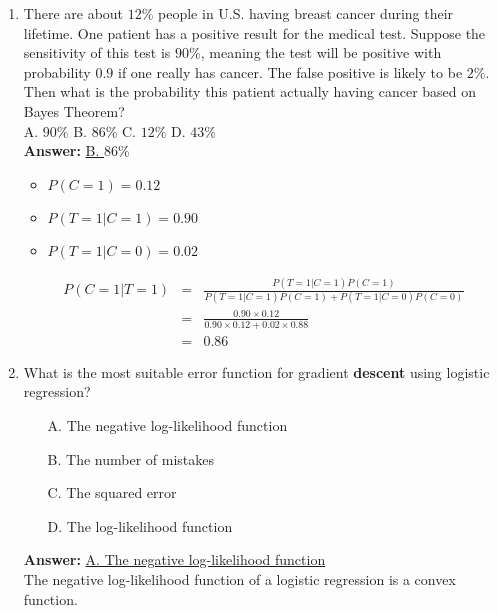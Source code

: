 \documentclass{article}
\begin{document}
\begin{enumerate}
	\item There are about $12\%$ people in U.S. having breast cancer during their lifetime. One patient has a positive result for the medical test. Suppose the sensitivity of this test is $90\%$, meaning the test will be positive with probability $0.9$ if one really has cancer. The false positive is likely to be $2\%$. Then what is the probability this patient actually having cancer based on Bayes Theorem?\\
	A. $90\%$ \hspace{0.1\textwidth} B. $86\%$ \hspace{0.1\textwidth} C. $12\%$ \hspace{0.1\textwidth} D. $43\%$\\
	\textbf{Answer:}
	\underline{B. $86\%$}\\
	\begin{itemize}
		\item $P(C=1)=0.12$
		\item $P(T=1|C=1)=0.90$
		\item $P(T=1|C=0)=0.02$
	\end{itemize}
	\begin{equation}
	\nonumber
	\begin{array}{rcl}
		P(C=1|T=1) &　=　& \frac{P(T=1|C=1)P(C=1)}{P(T=1|C=1)P(C=1)+P(T=1|C=0)P(C=0)} \\
				   & = & \frac{0.90\times0.12}{0.90\times0.12+0.02\times0.88} \\
				   & = & 0.86
	\end{array}
	\end{equation}
	
	\item What is the most suitable error function for gradient \textbf{descent} using logistic regression?
	\begin{itemize}
		\item [A.] The negative log-likelihood function
		\item [B.] The number of mistakes
		\item [C.] The squared error
		\item [D.] The log-likelihood function
	\end{itemize}
	\textbf{Answer:}
	\underline{A. The negative log-likelihood function}\\
	The negative log-likelihood function of a logistic regression is a convex function.
\end{enumerate}


\newpage
\end{document}
